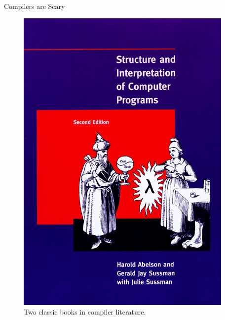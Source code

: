 \documentclass[presentation, bigger]{beamer}
\begin{document}
\begin{frame}[label={sec:org35ae571}]{Compilers are Scary}
\begin{figure}
\begin{minipage}[t]{0.2022\textwidth}
    \includegraphics[width=\textwidth]{img/presentation/intro-sicp-book.jpg}
  \end{minipage}
  \label{fig:magic-books}
  \caption{Two classic books in compiler literature.}
\end{figure}
\end{frame}
\end{document}
